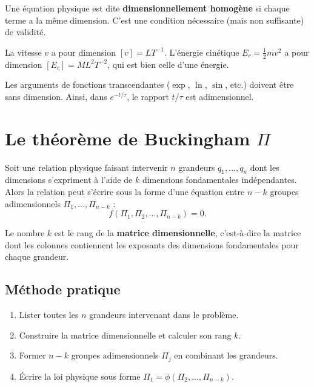 \begin{definition}
Une \'equation physique est dite \textbf{dimensionnellement homog\`ene}
si chaque terme a la m\^eme dimension.  C'est une condition
n\'ecessaire (mais non suffisante) de validit\'e.
\end{definition}

\begin{exemple}
La vitesse $v$ a pour dimension $[v]=LT^{-1}$.  L'\'energie cin\'etique
$E_c = \frac{1}{2}mv^2$ a pour dimension $[E_c]=ML^2T^{-2}$, qui
est bien celle d'une \'energie.
\end{exemple}

\begin{remarque}
Les arguments de fonctions transcendantes ($\exp$, $\ln$, $\sin$, etc.)
doivent \^etre sans dimension.  Ainsi, dans $e^{-t/\tau}$, le rapport
$t/\tau$ est adimensionnel.
\end{remarque}

\section{Le th\'eor\`eme de Buckingham $\Pi$}
\label{sec:buckingham}

\begin{theoreme}[Buckingham $\Pi$]
Soit une relation physique faisant intervenir $n$ grandeurs
$q_1,\ldots,q_n$ dont les dimensions s'expriment \`a l'aide de
$k$ dimensions fondamentales ind\'ependantes.  Alors la relation peut
s'\'ecrire sous la forme d'une \'equation entre $n-k$ groupes
adimensionnels $\Pi_1,\ldots,\Pi_{n-k}$ :
\[
  f(\Pi_1, \Pi_2, \ldots, \Pi_{n-k}) = 0.
\]
\end{theoreme}

\begin{remarque}
Le nombre $k$ est le rang de la \textbf{matrice dimensionnelle},
c'est-\`a-dire la matrice dont les colonnes contiennent les exposants
des dimensions fondamentales pour chaque grandeur.
\end{remarque}

\subsection{M\'ethode pratique}

\begin{enumerate}
  \item Lister toutes les $n$ grandeurs intervenant dans le probl\`eme.
  \item Construire la matrice dimensionnelle et calculer son rang $k$.
  \item Former $n-k$ groupes adimensionnels $\Pi_j$ en combinant les
        grandeurs.
  \item \'Ecrire la loi physique sous forme
        $\Pi_1 = \phi(\Pi_2,\ldots,\Pi_{n-k})$.
\end{enumerate}

